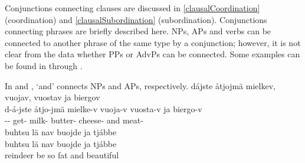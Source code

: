 \begin{table}[h]
\end{table}

Conjunctions connecting clauses are discussed in \SEC\ref{clausalCoordination} (coordination) and \SEC\ref{clausalSubordination} (subordination). 
Conjunctions connecting phrases are briefly described here. 
NPs, APs and verbs can be connected to another phrase of the same type by a conjunction; however, it is not clear from the data whether PPs or AdvPs can be connected. 
Some examples can be found in  through . 

In  and ,  ‘and’ connects NPs and APs, respectively. 
\ea\label{conjunctionEx1}%
\glll	dájste åtjojmä mielkev, vuojav, vuostav ja biergov\\
	d-á-jste åtjo-jmä mielke-v vuoja-v vuosta-v ja biergo-v\\
	-- get- milk- butter- cheese- and meat-\\\nopagebreak
{}	
\z
\ea\label{conjunctionEx2}%
\glll	buhtsu lä nav buojde ja tjábbe\\
	buhtsu lä nav buojde ja tjábbe\\
	reindeer\BS{} be\BS{} so fat\BS{} and beautiful\BS{} \\\nopagebreak
{}	
\z

